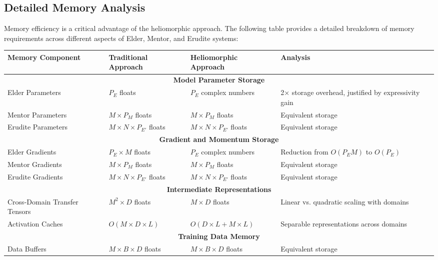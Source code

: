 \subsection{Detailed Memory Analysis}

Memory efficiency is a critical advantage of the heliomorphic approach. The following table provides a detailed breakdown of memory requirements across different aspects of Elder, Mentor, and Erudite systems:

\begin{table}[h]
\centering
\begin{tabular}{|p{3.5cm}|p{3.5cm}|p{3.5cm}|p{3.5cm}|}
\hline
\textbf{Memory Component} & \textbf{Traditional Approach} & \textbf{Heliomorphic Approach} & \textbf{Analysis} \\
\hline
\multicolumn{4}{|c|}{\textbf{Model Parameter Storage}} \\
\hline
Elder Parameters & $P_E$ floats & $P_E$ complex numbers & 2× storage overhead, justified by expressivity gain \\
\hline
Mentor Parameters & $M \times P_M$ floats & $M \times P_M$ floats & Equivalent storage \\
\hline
Erudite Parameters & $M \times N \times P_{E'}$ floats & $M \times N \times P_{E'}$ floats & Equivalent storage \\
\hline
\multicolumn{4}{|c|}{\textbf{Gradient and Momentum Storage}} \\
\hline
Elder Gradients & $P_E \times M$ floats & $P_E$ complex numbers & Reduction from $O(P_E M)$ to $O(P_E)$ \\
\hline
Mentor Gradients & $M \times P_M$ floats & $M \times P_M$ floats & Equivalent storage \\
\hline
Erudite Gradients & $M \times N \times P_{E'}$ floats & $M \times N \times P_{E'}$ floats & Equivalent storage \\
\hline
\multicolumn{4}{|c|}{\textbf{Intermediate Representations}} \\
\hline
Cross-Domain Transfer Tensors & $M^2 \times D$ floats & $M \times D$ floats & Linear vs. quadratic scaling with domains \\
\hline
Activation Caches & $O(M \times D \times L)$ & $O(D \times L + M \times L)$ & Separable representations across domains \\
\hline
\multicolumn{4}{|c|}{\textbf{Training Data Memory}} \\
\hline
Data Buffers & $M \times B \times D$ floats & $M \times B \times D$ floats & Equivalent storage \\

\end{tabular}
\end{table}
